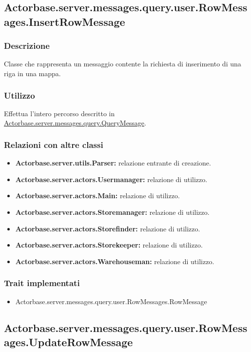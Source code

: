 \documentclass[a4paper]{article}
\begin{document}
		\subsection{Actorbase.server.messages.query.user.RowMessages.InsertRowMessage}
			\subsubsection{Descrizione}
				Classe che rappresenta un messaggio contente la richiesta di inserimento di una riga in una mappa.
				
			\subsubsection{Utilizzo}
				Effettua l'intero percorso descritto in \hyperref[QueryMessage]{Actorbase.server.messages.query.QueryMessage}.
				
			\subsubsection{Relazioni con altre classi}
				\begin{itemize}
					\item \textbf{Actorbase.server.utils.Parser:} relazione entrante di creazione.
					\item \textbf{Actorbase.server.actors.Usermanager:} relazione di utilizzo.
					\item \textbf{Actorbase.server.actors.Main:} relazione di utilizzo.
					\item \textbf{Actorbase.server.actors.Storemanager:} relazione di utilizzo.
					\item \textbf{Actorbase.server.actors.Storefinder:} relazione di utilizzo.
					\item \textbf{Actorbase.server.actors.Storekeeper:} relazione di utilizzo.
					\item \textbf{Actorbase.server.actors.Warehouseman:} relazione di utilizzo.
				\end{itemize}
			\subsubsection{Trait implementati}
				\begin{itemize}
					\item Actorbase.server.messages.query.user.RowMessages.RowMessage
				\end{itemize}
		
		\subsection{Actorbase.server.messages.query.user.RowMessages.UpdateRowMessage}
\end{document}
